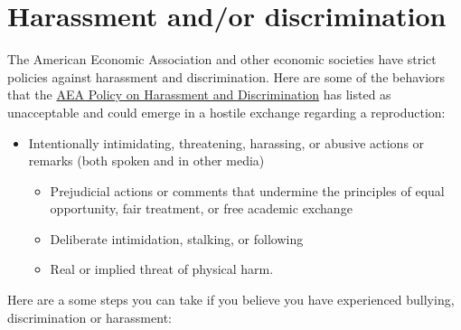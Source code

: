 \documentclass[]{book}
\providecommand{\tightlist}{%
  \setlength{\itemsep}{0pt}\setlength{\parskip}{0pt}}
\begin{document}
\hypertarget{harassment-andor-discrimination}{%
\section{Harassment and/or discrimination}\label{harassment-andor-discrimination}}

The American Economic Association and other economic societies have strict policies against harassment and discrimination. Here are some of the behaviors that the \href{https://www.aeaweb.org/about-aea/aea-policy-harassment-discrimination}{AEA Policy on Harassment and Discrimination} has listed as unacceptable and could emerge in a hostile exchange regarding a reproduction:

\begin{itemize}
\tightlist
\item
  Intentionally intimidating, threatening, harassing, or abusive actions or remarks (both spoken and in other media)

  \begin{itemize}
  \tightlist
  \item
    Prejudicial actions or comments that undermine the principles of equal opportunity, fair treatment, or free academic exchange
  \item
    Deliberate intimidation, stalking, or following
  \item
    Real or implied threat of physical harm.
  \end{itemize}
\end{itemize}

Here are a some steps you can take if you believe you have experienced bullying, discrimination or harassment:
\end{document}
